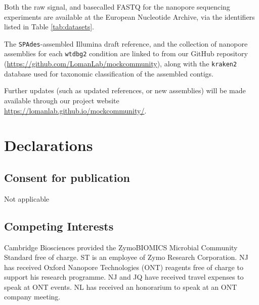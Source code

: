\documentclass[a4paper,num-refs]{oup-contemporary}
\begin{document}
Both the raw signal, and basecalled FASTQ for the nanopore sequencing experiments are available at the European Nucleotide Archive, via the identifiers listed in Table \ref{tab:datasets}.

The \texttt{SPAdes}-assembled Illumina draft reference, and the collection of nanopore assemblies for each \texttt{wtdbg2} condition are linked to from our GitHub repository (\url{https://github.com/LomanLab/mockcommunity}), along with the \texttt{kraken2} database used for taxonomic classification of the assembled contigs.
 
Further updates (such as updated references, or new assemblies) will be made available through our project website \url{https://lomanlab.github.io/mockcommunity/}.



\section{Declarations}



\subsection{Consent for publication}
Not applicable

\subsection{Competing Interests}
Cambridge Biosciences provided the ZymoBIOMICS Microbial Community Standard free of charge.
ST is an employee of Zymo Research Corporation.
NJ has received Oxford Nanopore Technologies (ONT) reagents free of charge to support his research programme.
NJ and JQ have received travel expenses to speak at ONT events.
NL has received an honorarium to speak at an ONT company meeting.
\end{document}
